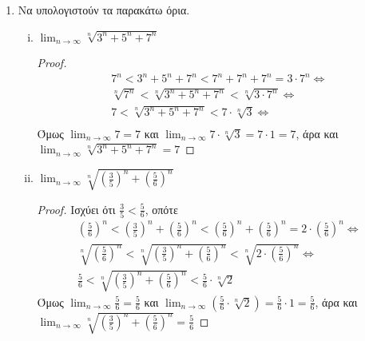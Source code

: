 \begin{enumerate}
    \item Να υπολογιστούν τα παρακάτω όρια.
        \begin{enumerate}[i)]
            \item $ \lim_{n \to \infty} \sqrt[n]{3^{n} + 5^{n}+7^{n}} $ 
                \begin{proof}
                    \begin{gather*}
                        7^{n} < 3^{n}+5^{n}+7^{n} < 7^{n}+7^{n}+7^{n} = 3\cdot 7^{n} 
                        \Leftrightarrow \\
                        \sqrt[n]{7^{n}} < \sqrt[n]{3^{n}+5^{n}+7^{n}} < 
                        \sqrt[n]{3 \cdot 7^{n}} \Leftrightarrow \\
                        7 < \sqrt[n]{3^{n}+5^{n}+7^{n}} < 7\cdot \sqrt[n]{3} 
                        \Leftrightarrow \\
                    \end{gather*}
                    Όμως $ \lim_{n \to \infty} 7 = 7 $ και $ \lim_{n \to \infty} 7 
                    \cdot \sqrt[n]{3} = 7 \cdot 1 = 7$, άρα και $ 
                    \lim_{n \to \infty} \sqrt[n]{3^{n}+5^{n}+7^{n}} = 7$
                \end{proof}

            \item $ \lim_{n \to \infty} \sqrt[n]{(\frac{3}{5})^{n}+(\frac{5}{6})^{n}} $
                \begin{proof}
                    Ισχύει ότι $ \frac{3}{5} < \frac{5}{6} $, οπότε
                    \begin{gather*}
                        \left(\frac{5}{6}\right)^{n} < \left(\frac{3}{5}\right)^{n}+ 
                        \left(\frac{5}{6}\right)^{n} < \left(\frac{5}{6}\right)^{n} + 
                        \left(\frac{5}{6}\right)^{n} = 2 \cdot 
                        \left(\frac{5}{6}\right)^{n} 
                        \Leftrightarrow \\
                        \sqrt[n]{\left(\frac{5}{6}\right)^{n}} < 
                        \sqrt[n]{\left(\frac{3}{5}\right)^{n}+ 
                        \left(\frac{5}{6}\right)^{n}} < 
                        \sqrt[n]{2\cdot \left(\frac{5}{6}\right)^{n}} 
                        \Leftrightarrow \\
                        \frac{5}{6} < \sqrt[n]{\left(\frac{3}{5}\right)^{n}+ 
                        \left(\frac{5}{6}\right)^{n}} < \frac{5}{6} \cdot 
                        \sqrt[n]{2} 
                    \end{gather*}
                    Όμως $ \lim_{n \to \infty} \frac{5}{6} = \frac{5}{6} $ και 
                    $ \lim_{n \to \infty} \left(\frac{5}{6} \cdot \sqrt[n]{2}\right) = 
                    \frac{5}{6} \cdot 1 = \frac{5}{6} $, άρα και $ 
                    \lim_{n \to \infty} \sqrt[n]{\left(\frac{3}{5} \right)^{n} + 
                    \left(\frac{5}{6}\right)^{n}} = \frac{5}{6} $
                \end{proof}


\end{enumerate}
\end{enumerate}
